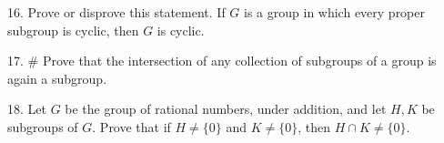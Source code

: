 \begin{mdframed}[style=darkAnswer,frametitle={Joe Starr}]

\end{mdframed}
\newpage
\begin{mdframed}[style=darkQuesion]
16. Prove or disprove this statement. If $G$ is a group in which every proper subgroup is cyclic, then $G$ is cyclic.

\end{mdframed}

\begin{mdframed}[style=darkAnswer,frametitle={Joe Starr}]

\end{mdframed}
\newpage
\begin{mdframed}[style=darkQuesion]
17. $\#$ Prove that the intersection of any collection of subgroups of a group is again a subgroup.

\end{mdframed}

\begin{mdframed}[style=darkAnswer,frametitle={Joe Starr}]

\end{mdframed}
\newpage
\begin{mdframed}[style=darkQuesion]
18. Let $G$ be the group of rational numbers, under addition, and let $H, K$ be subgroups
of $G .$ Prove that if $H \neq\{0\}$ and $K \neq\{0\}$, then $H \cap K \neq\{0\}$.

\end{mdframed}

